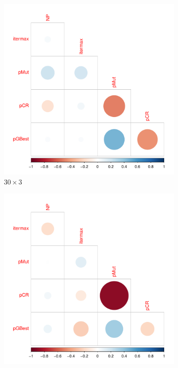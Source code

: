 \documentclass [PhD] {package/uclathes}
\begin{document}
\begin{figure}%
\centering
\begin{subfigure}[b]{0.3\textwidth}
\centering
\includegraphics{chapters/RSO/pdfs/corplot30_1}
\caption{$30\times 3$}
\end{subfigure}
\begin{subfigure}[b]{0.3\textwidth}
\centering
\includegraphics{chapters/RSO/pdfs/corplot50_1}

\end{subfigure}
\end{figure}
\end{document}

